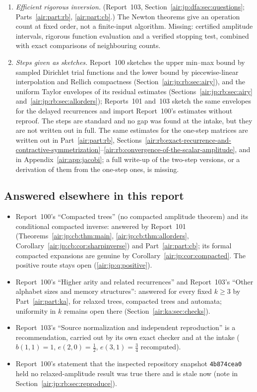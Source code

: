 \documentclass[11pt,letterpaper]{article}
\numberwithin{equation}{section}
\theoremstyle{remark}
\begin{document}
\begin{enumerate}[label=\textbf{V.\arabic*}, ref=V.\arabic*, leftmargin=*]
\item\label{air:jp:q:inversion} \emph{Efficient rigorous inversion.} (Report~103, Section~\ref{air:jp:dfa:sec:questions}; Parts~\ref{air:part:rb}, \ref{air:part:cb}.) The Newton theorems give an operation count at fixed order, not a finite-input algorithm. Missing: certified amplitude intervals, rigorous function evaluation and a verified stopping test, combined with exact comparisons of neighbouring counts.
\item\label{air:jp:q:sketched} \emph{Steps given as sketches.} Report~100 sketches the upper min--max bound by sampled Dirichlet trial functions and the lower bound by piecewise-linear interpolation and Rellich compactness (Section~\ref{air:jp:rb:sec:airy}), and the uniform Taylor envelopes of its residual estimates (Sections~\ref{air:jp:rb:sec:airy} and~\ref{air:jp:rb:sec:allorders}); Reports~101 and~103 sketch the same envelopes for the delayed recurrences and import Report~100's estimates without reproof. The steps are standard and no gap was found at the intake, but they are not written out in full. The same estimates for the one-step matrices are written out in Part~\ref{air:part:rb}, Sections~\ref{air:rb:exact-recurrence-and-contractive-symmetrization}--\ref{air:rb:convergence-of-the-scalar-amplitude}, and in Appendix~\ref{air:app:jacobi}; a full write-up of the two-step versions, or a derivation of them from the one-step ones, is missing.
\end{enumerate}

\subsection{Answered elsewhere in this report}
\begin{itemize}
\item Report~100's ``Compacted trees'' (no compacted amplitude theorem) and its conditional compacted inverse: answered by Report~101 (Theorems~\ref{air:jp:cb:thm:main}, \ref{air:jp:cb:thm:allorders}, Corollary~\ref{air:jp:cb:cor:sharpinverse}) and Part~\ref{air:part:cb}; its formal compacted expansions are genuine by Corollary~\ref{air:jp:cor:compacted}. The positive route stays open (\ref{air:jp:q:positive}).
\item Report~100's ``Higher arity and related recurrences'' and Report~103's ``Other alphabet sizes and memory structures'': answered for every fixed $k\ge3$ by Part~\ref{air:part:ka}, for relaxed trees, compacted trees and automata; uniformity in $k$ remains open there (Section~\ref{air:ka:sec:checks}).
\item Report~103's ``Source normalization and independent reproduction'' is a recommendation, carried out by its own exact checker and at the intake ($b(1,1)=1$, $e(2,0)=\frac12$, $e(3,1)=\frac34$ recomputed).
\item Report~100's statement that the inspected repository snapshot \texttt{4b874cea0} held no relaxed-amplitude result was true there and is stale now (note in Section~\ref{air:jp:rb:sec:reproduce}).
\end{itemize}
\end{document}
